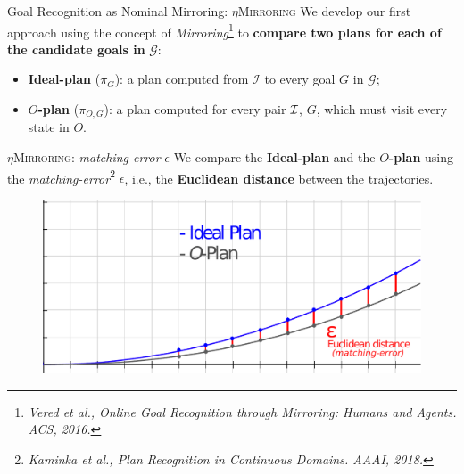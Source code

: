 \documentclass[usenames,dvipsnames]{beamer}
\begin{document}
    \begin{frame}{Goal Recognition as Nominal Mirroring: $\eta$\textsc{Mirroring}}
			We develop our first approach using the concept of \emph{Mirroring}\footnote{\tiny \it Vered et al., Online Goal Recognition through Mirroring: Humans and Agents. ACS, 2016.} to \textbf{compare two plans for each of the candidate goals in} $\mathcal{G}$:
			\vspace{2mm}
	       	\begin{itemize}
				\vspace{2mm}
	       		\item \textbf{Ideal-plan} ($\pi_G$): a plan computed from $\mathcal{I}$ to every goal $G$ in $\mathcal{G}$;
				\vspace{2mm}
				\item \textbf{$O$-plan} ($\pi_{O,G}$): a plan computed for every pair ${\cal I}$, $G$, which must visit every state in $O$. 
			\end{itemize}
    \end{frame}
	
    \begin{frame}{$\eta$\textsc{Mirroring}: \emph{matching-error} {\huge $\epsilon$}}
		We compare the \textbf{Ideal-plan} and the \textbf{$O$-plan} using the \emph{matching-error}\footnote{\tiny \it Kaminka et al., Plan Recognition in Continuous Domains. AAAI, 2018.} {\huge $\epsilon$}, i.e., the \textbf{Euclidean distance} between the trajectories.

		\begin{figure}[]
		 	\centering
		 	\includegraphics[width=0.85\linewidth]{fig/nominal_mirroring.pdf}
			\vspace{-2mm}
		\end{figure}
    \end{frame}
\end{document}
